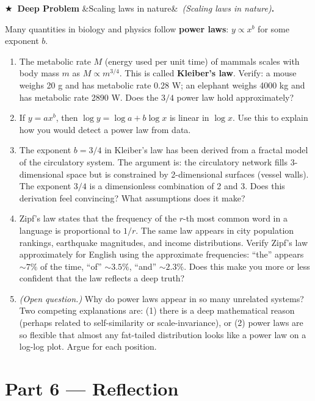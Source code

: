 \documentclass[12pt, a4paper]{article}
\newcounter{problem}
\newcounter{deepproblem}
\newenvironment{deepproblem}[1][]{%
  \refstepcounter{deepproblem}%
  \par\vspace{6pt}%
  \noindent\textbf{\color{NavyBlue}$\bigstar$\ Deep Problem \thedeepproblem}%
  \ifx&#1&\else\ \textit{(#1)}\fi\textbf{.}\enskip
}{\par\vspace{4pt}}
\begin{document}
\begin{deepproblem}[Scaling laws in nature]
Many quantities in biology and physics follow \textbf{power laws}: $y \propto x^b$ for some exponent $b$.
\begin{enumerate}[label=(\alph*)]
  \item The metabolic rate $M$ (energy used per unit time) of mammals scales with body mass $m$ as $M \propto m^{3/4}$. This is called \textbf{Kleiber's law}. Verify: a mouse weighs 20 g and has metabolic rate 0.28 W; an elephant weighs 4000 kg and has metabolic rate 2890 W. Does the $3/4$ power law hold approximately?
  \item If $y = ax^b$, then $\log y = \log a + b \log x$ is linear in $\log x$. Use this to explain how you would detect a power law from data.
  \item The exponent $b = 3/4$ in Kleiber's law has been derived from a fractal model of the circulatory system. The argument is: the circulatory network fills 3-dimensional space but is constrained by 2-dimensional surfaces (vessel walls). The exponent $3/4$ is a dimensionless combination of 2 and 3. Does this derivation feel convincing? What assumptions does it make?
  \item Zipf's law states that the frequency of the $r$-th most common word in a language is proportional to $1/r$. The same law appears in city population rankings, earthquake magnitudes, and income distributions. Verify Zipf's law approximately for English using the approximate frequencies: ``the'' appears $\sim 7\%$ of the time, ``of'' $\sim 3.5\%$, ``and'' $\sim 2.3\%$. Does this make you more or less confident that the law reflects a deep truth?
  \item \textit{(Open question.)} Why do power laws appear in so many unrelated systems? Two competing explanations are: (1) there is a deep mathematical reason (perhaps related to self-similarity or scale-invariance), or (2) power laws are so flexible that almost any fat-tailed distribution looks like a power law on a log-log plot. Argue for each position.
\end{enumerate}
\end{deepproblem}

\section{Part 6 \texorpdfstring{---}{--} Reflection}
\end{document}

